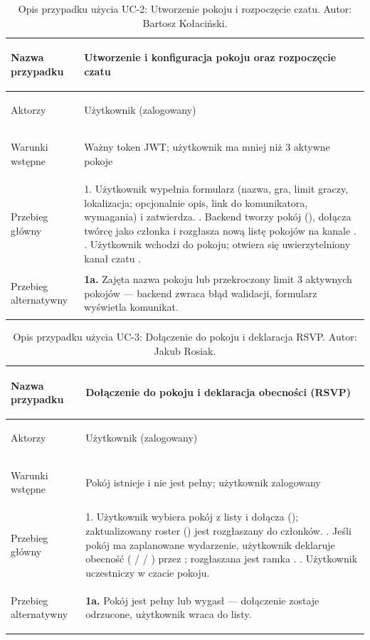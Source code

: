\begin{table}[H]\footnotesize
\renewcommand{\arraystretch}{1.3}
\caption{Opis przypadku użycia UC-2: Utworzenie pokoju i rozpoczęcie czatu. Autor: Bartosz Kołaciński.}
\label{tab:uc2}
\begin{tabularx}{\textwidth}{@{}>{\bfseries\raggedright\arraybackslash}p{}Y@{}}
\toprule
Nazwa przypadku & Utworzenie i konfiguracja pokoju oraz rozpoczęcie czatu \\
\midrule
Aktorzy & Użytkownik (zalogowany) \\
Warunki wstępne & Ważny token JWT; użytkownik ma mniej niż 3 aktywne pokoje \\
Przebieg główny &
  1. Użytkownik wypełnia formularz (nazwa, gra, limit graczy, lokalizacja; opcjonalnie opis, link do komunikatora, wymagania) i zatwierdza. . Backend tworzy pokój (), dołącza twórcę jako członka i rozgłasza nową listę pokojów na kanale . . Użytkownik wchodzi do pokoju; otwiera się uwierzytelniony kanał czatu . \\
Przebieg alternatywny &
  \textbf{1a.} Zajęta nazwa pokoju lub przekroczony limit 3 aktywnych pokojów — backend zwraca błąd walidacji, formularz wyświetla komunikat. \\
\bottomrule
\end{tabularx}
\end{table}

\begin{table}[H]\footnotesize
\renewcommand{\arraystretch}{1.3}
\caption{Opis przypadku użycia UC-3: Dołączenie do pokoju i deklaracja RSVP. Autor: Jakub Rosiak.}
\label{tab:uc3}
\begin{tabularx}{\textwidth}{@{}>{\bfseries\raggedright\arraybackslash}p{}Y@{}}
\toprule
Nazwa przypadku & Dołączenie do pokoju i deklaracja obecności (RSVP) \\
\midrule
Aktorzy & Użytkownik (zalogowany) \\
Warunki wstępne & Pokój istnieje i nie jest pełny; użytkownik zalogowany \\
Przebieg główny &
  1. Użytkownik wybiera pokój z listy i dołącza (); zaktualizowany roster () jest rozgłaszany do członków. . Jeśli pokój ma zaplanowane wydarzenie, użytkownik deklaruje obecność ( /  / ) przez ; rozgłaszana jest ramka . . Użytkownik uczestniczy w czacie pokoju. \\
Przebieg alternatywny &
  \textbf{1a.} Pokój jest pełny lub wygasł — dołączenie zostaje odrzucone, użytkownik wraca do listy. \\
\bottomrule
\end{tabularx}
\end{table}

